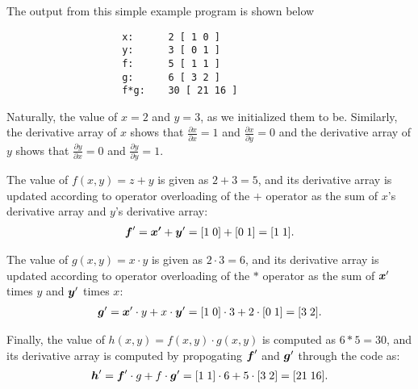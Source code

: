 The output from this simple example program is shown below
%
\begin{verbatim}
                    x:      2 [ 1 0 ]
                    y:      3 [ 0 1 ]
                    f:      5 [ 1 1 ]
                    g:      6 [ 3 2 ]
                    f*g:    30 [ 21 16 ]
\end{verbatim}
%
Naturally, the value of $x=2$ and $y=3$, as we initialized them to be.
Similarly, the derivative array of $x$ shows that
$\frac{\partial x}{\partial x} = 1$ and $\frac{\partial x}{\partial y} = 0$
and the derivative array of $y$ shows that $\frac{\partial y}{\partial x} = 0$
and $\frac{\partial y}{\partial y} = 1$.

The value of $f(x,y) = z+ y$ is given as $2+3=5$, and its derivative array is
updated according to operator overloading of the $+$ operator as the sum of
$x$'s derivative array and $y$'s derivative array:
%
\begin{gather}
\boldsymbol{f}' = \boldsymbol{x'} + \boldsymbol{y}' = [1 \; 0] + [0 \; 1] = [1 \; 1].
\end{gather}

The value of $g(x,y) = x \cdot y$ is given as $2\cdot3 = 6$, and its
derivative array is updated according to operator overloading of the $*$
operator as the sum of $\boldsymbol{x}'$ times $y$ and $\boldsymbol{y}'$ times $x$:
%
\begin{gather}
\boldsymbol{g}' = \boldsymbol{x}' \cdot y + x \cdot \boldsymbol{y}' =
[1 \; 0] \cdot 3 + 2 \cdot [0 \; 1] =
[3 \; 2].
\end{gather}

Finally, the value of $h(x,y) = f(x,y) \cdot g(x,y)$ is computed as $6*5 = 30$,
and its derivative array is computed by propogating $\boldsymbol{f}'$ and $\boldsymbol{g}'$
through the code as:
%
\begin{gather}
\boldsymbol{h}' = \boldsymbol{f}' \cdot g + f \cdot \boldsymbol{g}' =
[1 \; 1] \cdot 6 + 5 \cdot [3 \; 2] =
[21 \; 16].
\end{gather}
